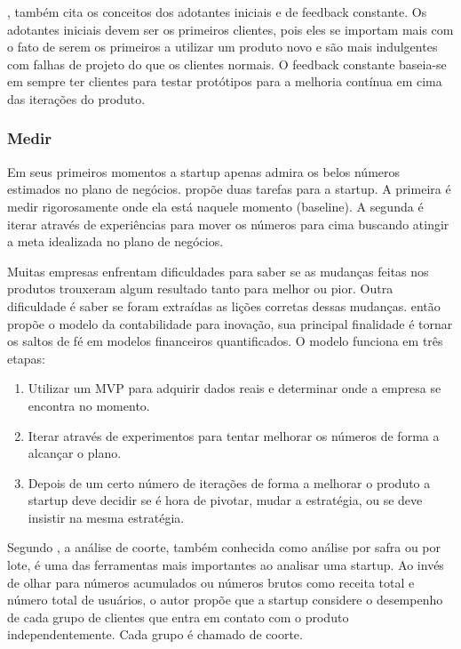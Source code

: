 , também cita os conceitos dos adotantes iniciais e de feedback constante. Os adotantes iniciais devem ser os primeiros clientes, pois eles se importam mais com o fato de serem os primeiros a utilizar um produto novo e são mais indulgentes com falhas de projeto do que os clientes normais. O feedback constante baseia-se em sempre ter clientes para testar protótipos para a melhoria contínua em cima das iterações do produto.

\subsubsection{Medir}
\label{cha:medir}

Em seus primeiros momentos a startup apenas admira os belos números estimados no plano de negócios.  propõe duas tarefas para a startup. A primeira é medir rigorosamente onde ela está naquele momento (baseline). A segunda é iterar através de experiências para mover os números para cima buscando atingir a meta idealizada no plano de negócios.

Muitas empresas enfrentam dificuldades para saber se as mudanças feitas nos produtos trouxeram algum resultado tanto para melhor ou pior. Outra dificuldade é saber se foram extraídas as lições corretas dessas mudanças.  então propõe o modelo da contabilidade para inovação, sua principal finalidade é tornar os saltos de fé em modelos financeiros quantificados. O modelo funciona em três etapas:
\begin{enumerate}
\item Utilizar um MVP para adquirir dados reais e determinar onde a empresa se encontra no momento.
\item Iterar através de experimentos para tentar melhorar os números de forma a alcançar o plano.
\item Depois de um certo número de iterações de forma a melhorar o produto a startup deve decidir se é hora de pivotar, mudar a estratégia, ou se deve insistir na mesma estratégia.
\end{enumerate}

Segundo , a análise de coorte, também conhecida como análise por safra ou por lote, é uma das ferramentas mais importantes ao analisar uma startup. Ao invés de olhar para números acumulados ou números brutos como receita total e número total de usuários, o autor propõe que a startup considere o desempenho de cada grupo de clientes que entra em contato com o produto independentemente. Cada grupo é chamado de coorte.

